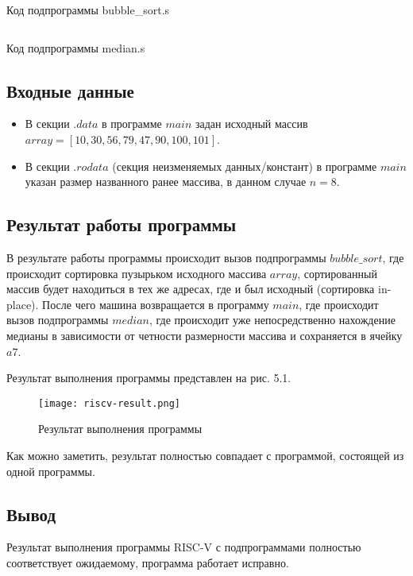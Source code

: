 \begin{code}
	\inputminted[breaklines=true, xleftmargin=1em, linenos, frame=single, framesep=10pt, fontsize=\footnotesize, firstline=1]{asm}{listings/bubble_sort.s}
	\caption{Код подпрограммы bubble\_sort.s}
\end{code}

\begin{code}
	\inputminted[breaklines=true, xleftmargin=1em, linenos, frame=single, framesep=10pt, fontsize=\footnotesize, firstline=1]{asm}{listings/median.s}
	\caption{Код подпрограммы median.s}
\end{code}

\subsection{Входные данные}

\begin{itemize}
	\item В секции \(.data\) в программе \(main\) задан исходный массив \(array = [10, 30, 56, 79, 47, 90, 100, 101]\).
	\item В секции \(.rodata\) (секция неизменяемых данных/констант) в программе \(main\) указан размер названного ранее массива, в данном случае \(n = 8\).
\end{itemize}

\subsection{Результат работы программы}
В результате работы программы происходит вызов подпрограммы \(bubble\_sort\), где происходит сортировка пузырьком исходного массива \(array\), сортированный массив будет находиться в тех же адресах, где и был исходный (сортировка in-place). После чего машина возвращается в программу \(main\), где происходит вызов подпрограммы \(median\), где происходит уже непосредственно нахождение медианы в зависимости от четности размерности массива и сохраняется в ячейку \(a7\).

Результат выполнения программы представлен на рис. 5.1.

\begin{figure}[H]
	\centering
	\texttt{[image: riscv-result.png]}
	\caption{Результат выполнения программы}
\end{figure}

Как можно заметить, результат полностью совпадает с программой, состоящей из одной программы.

\subsection{Вывод}
Результат выполнения программы RISC-V с подпрограммами полностью соответствует ожидаемому, программа работает исправно.

